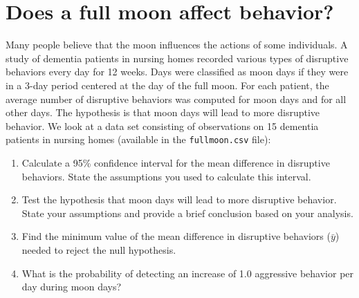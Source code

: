 \documentclass[letterpaper,11pt,twoside,]{pinp}
\providecommand{\tightlist}{%
  \setlength{\itemsep}{0pt}\setlength{\parskip}{0pt}}
\begin{document}
\hypertarget{does-a-full-moon-affect-behavior}{%
\section{Does a full moon affect
behavior?}\label{does-a-full-moon-affect-behavior}}

Many people believe that the moon influences the actions of some
individuals. A study of dementia patients in nursing homes recorded
various types of disruptive behaviors every day for 12 weeks. Days were
classified as moon days if they were in a 3-day period centered at the
day of the full moon. For each patient, the average number of disruptive
behaviors was computed for moon days and for all other days. The
hypothesis is that moon days will lead to more disruptive behavior. We
look at a data set consisting of observations on 15 dementia patients in
nursing homes (available in the \texttt{fullmoon.csv} file):

\begin{Shaded}
\begin{Highlighting}[]
\OtherTok{\textless{}{-}} \NormalTok{(}\NormalTok{)}
\end{Highlighting}
\end{Shaded}

\begin{enumerate}
\def\labelenumi{\alph{enumi}.}
\tightlist
\item
  Calculate a 95\% confidence interval for the mean difference in
  disruptive behaviors. State the assumptions you used to calculate this
  interval.
\item
  Test the hypothesis that moon days will lead to more disruptive
  behavior. State your assumptions and provide a brief conclusion based
  on your analysis.
\item
  Find the minimum value of the mean difference in disruptive behaviors
  (\(\bar{y}\)) needed to reject the null hypothesis.
\item
  What is the probability of detecting an increase of 1.0 aggressive
  behavior per day during moon days?
\end{enumerate}





\end{document}
